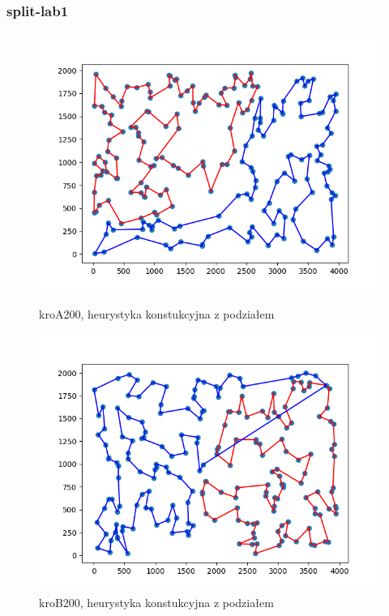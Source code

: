 \documentclass[11pt]{article}
\begin{document}
\subsubsection{split-lab1}
\begin{figure}[H]
    \begin{minipage}[t]{0.45\textwidth}
        \centering
        \includegraphics[width=\linewidth]{best_paths_constructions/kroA200/split_paths_regret_TSP}
        \caption{kroA200, heurystyka konstukcyjna z podziałem}
    \end{minipage}
    \hfill
    \begin{minipage}[t]{0.45\textwidth}
        \centering
        \includegraphics[width=\linewidth]{best_paths_constructions/kroB200/split_paths_regret_TSP}
        \caption{kroB200, heurystyka konstukcyjna z podziałem}
    \end{minipage}\label{fig:figure34}
\end{figure}
\end{document}
